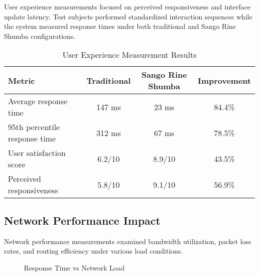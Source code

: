 \documentclass[12pt,a4paper]{article}
\begin{document}
User experience measurements focused on perceived responsiveness and interface update latency. Test subjects performed standardized interaction sequences while the system measured response times under both traditional and Sango Rine Shumba configurations.

\begin{table}[htbp]
\centering
\caption{User Experience Measurement Results}
\begin{tabular}{@{}lccc@{}}
\toprule
\textbf{Metric} & \textbf{Traditional} & \textbf{Sango Rine Shumba} & \textbf{Improvement} \\
\midrule
Average response time & 147 ms & 23 ms & 84.4\% \\
95th percentile response time & 312 ms & 67 ms & 78.5\% \\
User satisfaction score & 6.2/10 & 8.9/10 & 43.5\% \\
Perceived responsiveness & 5.8/10 & 9.1/10 & 56.9\% \\
\bottomrule
\end{tabular}
\end{table}

\subsection{Network Performance Impact}

Network performance measurements examined bandwidth utilization, packet loss rates, and routing efficiency under various load conditions.

\begin{figure}[htbp]
\centering
{}
\caption{Response Time vs Network Load}
\end{figure}
\end{document}
